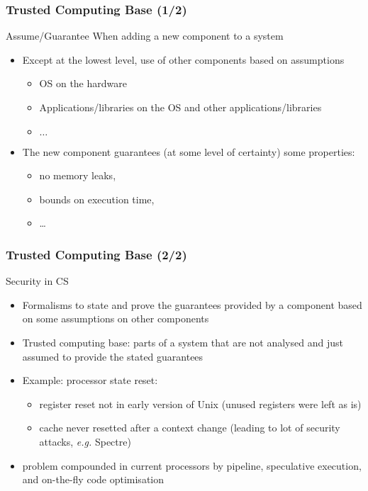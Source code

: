 \begin{reveals}
\begin{frame}
  \frametitle{Trusted Computing Base (1/2)}

  \begin{block}{Assume/Guarantee}
    When adding a new component to a system
    \begin{itemize}
    \item Except at the lowest level, use of other components based on assumptions  
      \begin{itemize}
      \item OS on the hardware
      \item Applications/libraries on the OS and other applications/libraries
      \item $\ldots$
      \end{itemize}
    \item The new component guarantees (at some level of certainty) some properties:
      \begin{itemize}
      \item no memory leaks,
      \item bounds on execution time,
      \item \ldots
      \end{itemize}
    \end{itemize}
  \end{block}
\end{frame}

\begin{frame}
  \frametitle{Trusted Computing Base (2/2)}

  \begin{block}{Security in CS}
    \begin{itemize}
    \item Formalisms to state and prove the guarantees provided by a
      component based on some assumptions on other components
    \item Trusted computing base: parts of a system that are not
      analysed and just assumed to provide the stated guarantees
    \item Example: processor state reset:
      \begin{itemize}
      \item register reset not in early version of Unix (unused registers were left as is)
      \item cache never resetted after a context change (leading to
        lot of security attacks, \textit{e.g.} Spectre)
      \end{itemize}
    \item problem compounded in current processors by pipeline,
      speculative execution, and on-the-fly code optimisation
    \end{itemize}
  \end{block}
\end{frame}



\end{reveals}
